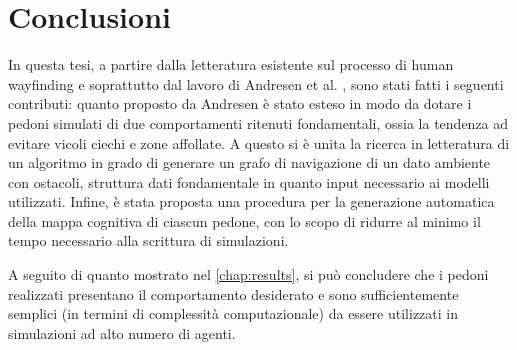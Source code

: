 \documentclass[12pt,a4paper,openright,oneside]{book}
\begin{document}
\section{Conclusioni}
In questa tesi, a partire dalla letteratura esistente sul processo di human wayfinding e soprattutto dal lavoro di Andresen et al. \cite{Andresen2018}, sono stati fatti i seguenti contributi: quanto proposto da Andresen è stato esteso in modo da dotare i pedoni simulati di due comportamenti ritenuti fondamentali, ossia la tendenza ad evitare vicoli ciechi e zone affollate. A questo si è unita la ricerca in letteratura di un algoritmo in grado di generare un grafo di navigazione di un dato ambiente con ostacoli, struttura dati fondamentale in quanto input necessario ai modelli utilizzati. Infine, è stata proposta una procedura per la generazione automatica della mappa cognitiva di ciascun pedone, con lo scopo di ridurre al minimo il tempo necessario alla scrittura di simulazioni. 

A seguito di quanto mostrato nel \cref{chap:results}, si può concludere che i pedoni realizzati presentano il comportamento desiderato e sono sufficientemente semplici (in termini di complessità computazionale) da essere utilizzati in simulazioni ad alto numero di agenti.
\end{document}
